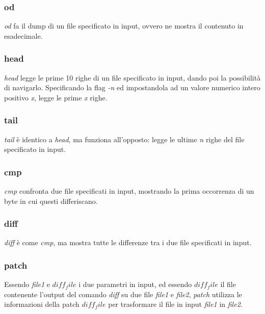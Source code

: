 \subsubsection{od}
\textit{od} fa il dump di un file specificato in input, ovvero ne mostra il contenuto in esadecimale.

\subsubsection{head}
\textit{head} legge le prime 10 righe di un file specificato in input, dando poi la possibilità di navigarlo. Specificando la flag \textit{-n} ed impostandola ad un valore numerico intero positivo \textit{x}, legge le prime \textit{x} righe.

\subsubsection{tail}
\textit{tail} è identico a \textit{head}, ma funziona all'opposto: legge le ultime \textit{n} righe del file specificato in input.

\subsubsection{cmp}
\textit{cmp} confronta due file specificati in input, mostrando la prima occorrenza di un byte in cui questi differiscano.

\subsubsection{diff}
\textit{diff} è come \textit{cmp}, ma mostra tutte le differenze tra i due file specificati in input.

\subsubsection{patch}
Essendo \textit{file1} e \textit{$ diff_file $} i due parametri in input,
 ed essendo \textit{$ diff_file $} il file contenente l'output del comando \textit{diff} su due file \textit{file1} e \textit{file2}, \textit{patch} utilizza le informazioni della patch \textit{$ diff_file $} per trasformare il file in input \textit{file1} in \textit{file2}.

